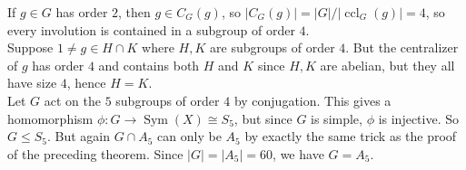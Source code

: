 \begin{example}
    If $g\in G$ has order $2$, then $g\in C_G(g)$, so $|C_G(g)|=|G|/|\operatorname{ccl}_G(g)|=4$, so every involution is contained in a subgroup of order $4$.\\
    Suppose $1\neq g\in H\cap K$ where $H,K$ are subgroups of order $4$.
    But the centralizer of $g$ has order $4$ and contains both $H$ and $K$ since $H,K$ are abelian, but they all have size $4$, hence $H=K$.\\
    Let $G$ act on the $5$ subgroups of order $4$ by conjugation.
    This gives a homomorphism $\phi:G\to\operatorname{Sym}(X)\cong S_5$, but since $G$ is simple, $\phi$ is injective.
    So $G\le S_5$.
    But again $G\cap A_5$ can only be $A_5$ by exactly the same trick as the proof of the preceding theorem.
    Since $|G|=|A_5|=60$, we have $G=A_5$.
 \end{example}
 